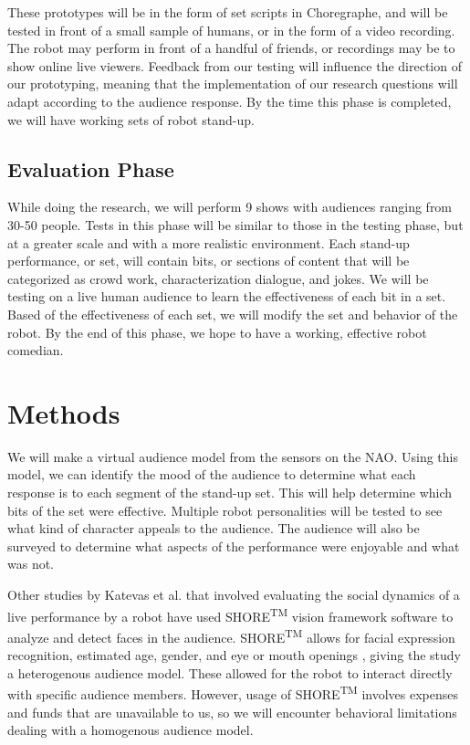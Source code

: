 \documentclass[onecolumn, draftclsnofoot,10pt, compsoc]{IEEEtran}
\begin{document}
These prototypes will be in the form of set scripts in Choregraphe, and will be tested in front of a small sample of humans, or in the form of a video recording. The robot may perform in front of a handful of friends, or recordings may be to show online live viewers. Feedback from our testing will influence the direction of our prototyping, meaning that the implementation of our research questions will adapt according to the audience response. By the time this phase is completed, we will have working sets of robot stand-up.

\subsection{Evaluation Phase}
While doing the research, we will perform 9 shows with audiences ranging from 30-50 people. Tests in this phase will be similar to those in the testing phase, but at a greater scale and with a more realistic environment. Each stand-up performance, or set, will contain bits, or sections of content that will be categorized as crowd work, characterization dialogue, and jokes. We will be testing on a live human audience to learn the effectiveness of each bit in a set. Based of the effectiveness of each set, we will modify the set and behavior of the robot. By the end of this phase, we hope to have a working, effective robot comedian.

\section{Methods}
We will make a virtual audience model from the sensors on the NAO. Using this model, we can identify the mood of the audience to determine what each response is to each segment of the stand-up set. This will help determine which bits of the set were effective. Multiple robot personalities will be tested to see what kind of character appeals to the audience. The audience will also be surveyed to determine what aspects of the performance were enjoyable and what was not.


Other studies by Katevas et al. \cite{KatevasRobot:2014} that involved evaluating the social dynamics of a live performance by a robot have used SHORE\textsuperscript{TM} vision framework software to analyze and detect faces in the audience. SHORE\textsuperscript{TM} allows for facial expression recognition, estimated age, gender, and eye or mouth openings \cite{SHORE}, giving the study a heterogenous audience model. These allowed for the robot to interact directly with specific audience members. However, usage of SHORE\textsuperscript{TM} involves expenses and funds that are unavailable to us, so we will encounter behavioral limitations dealing with a homogenous audience model.
\end{document}

